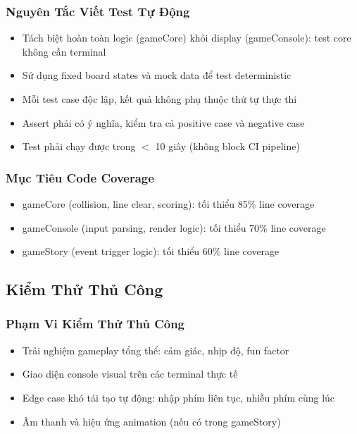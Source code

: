 \documentclass[12pt,a4paper]{article}
\begin{document}
\subsubsection{Nguyên Tắc Viết Test Tự Động}
\begin{itemize}[leftmargin=3em]
  \item Tách biệt hoàn toàn logic (gameCore) khỏi display (gameConsole): test core không cần terminal
  \item Sử dụng fixed board states và mock data để test deterministic
  \item Mỗi test case độc lập, kết quả không phụ thuộc thứ tự thực thi
  \item Assert phải có ý nghĩa, kiểm tra cả positive case và negative case
  \item Test phải chạy được trong $<$ 10 giây (không block CI pipeline)
\end{itemize}

\subsubsection{Mục Tiêu Code Coverage}
\begin{itemize}[leftmargin=3em]
  \item gameCore (collision, line clear, scoring): tối thiểu 85\% line coverage
  \item gameConsole (input parsing, render logic): tối thiểu 70\% line coverage
  \item gameStory (event trigger logic): tối thiểu 60\% line coverage
\end{itemize}

\subsection{Kiểm Thử Thủ Công}

\subsubsection{Phạm Vi Kiểm Thử Thủ Công}
\begin{itemize}[leftmargin=3em]
  \item Trải nghiệm gameplay tổng thể: cảm giác, nhịp độ, fun factor
  \item Giao diện console visual trên các terminal thực tế
  \item Edge case khó tái tạo tự động: nhập phím liên tục, nhiều phím cùng lúc
  \item Âm thanh và hiệu ứng animation (nếu có trong gameStory)
\end{itemize}
\end{document}
